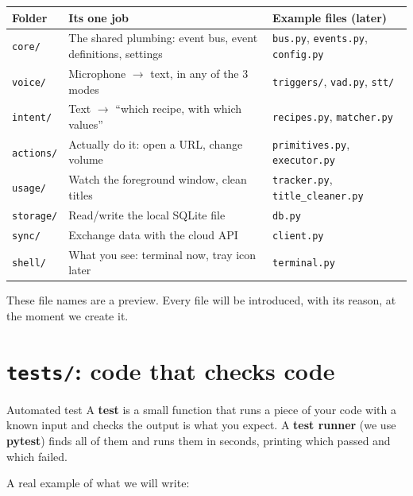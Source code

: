 \documentclass[11pt,a4paper]{article}
\begin{document}
\begin{center}
\renewcommand{\arraystretch}{1.2}
\begin{tabularx}{\textwidth}{l X X}
\toprule
\textbf{Folder} & \textbf{Its one job} & \textbf{Example files (later)} \\
\midrule
\texttt{core/}    & The shared plumbing: event bus, event definitions, settings & \texttt{bus.py}, \texttt{events.py}, \texttt{config.py} \\
\texttt{voice/}   & Microphone $\to$ text, in any of the 3 modes & \texttt{triggers/}, \texttt{vad.py}, \texttt{stt/} \\
\texttt{intent/}  & Text $\to$ ``which recipe, with which values'' & \texttt{recipes.py}, \texttt{matcher.py} \\
\texttt{actions/} & Actually do it: open a URL, change volume & \texttt{primitives.py}, \texttt{executor.py} \\
\texttt{usage/}   & Watch the foreground window, clean titles & \texttt{tracker.py}, \texttt{title\_cleaner.py} \\
\texttt{storage/} & Read/write the local SQLite file & \texttt{db.py} \\
\texttt{sync/}    & Exchange data with the cloud API & \texttt{client.py} \\
\texttt{shell/}   & What you see: terminal now, tray icon later & \texttt{terminal.py} \\
\bottomrule
\end{tabularx}
\end{center}

\noindent These file names are a preview. Every file will be introduced, with its reason, at
the moment we create it.

\section{\texttt{tests/}: code that checks code}

\begin{concept}{Automated test}
A \textbf{test} is a small function that runs a piece of your code with a known input and
checks the output is what you expect. A \textbf{test runner} (we use \textbf{pytest}) finds
all of them and runs them in seconds, printing which passed and which failed.
\end{concept}

\noindent A real example of what we will write:
\end{document}
